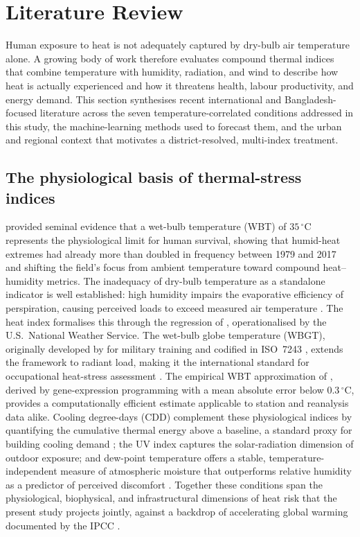 \documentclass[review,11pt]{elsarticle}
\newcommand{\degC}{\ensuremath{^{\circ}\mathrm{C}}}
\begin{document}
\section{Literature Review}\label{sec:litreview}

Human exposure to heat is not adequately captured by dry-bulb air temperature
alone. A growing body of work therefore evaluates compound thermal indices that
combine temperature with humidity, radiation, and wind to describe how heat is
actually experienced and how it threatens health, labour productivity, and energy
demand. This section synthesises recent international and Bangladesh-focused
literature across the seven temperature-correlated conditions addressed in this
study, the machine-learning methods used to forecast them, and the urban and
regional context that motivates a district-resolved, multi-index treatment.

\subsection{The physiological basis of thermal-stress indices}
\citet{raymond2020} provided seminal evidence that a wet-bulb temperature (WBT)
of $35\,\degC$ represents the physiological limit for human survival, showing that
humid-heat extremes had already more than doubled in frequency between 1979 and
2017 and shifting the field's focus from ambient temperature toward compound
heat--humidity metrics. The inadequacy of dry-bulb temperature as a standalone
indicator is well established: high humidity impairs the evaporative efficiency of
perspiration, causing perceived loads to exceed measured air temperature
\citep{steadman1979}. The heat index formalises this through the regression of
\citet{rothfusz1990}, operationalised by the U.S.\ National Weather Service. The
wet-bulb globe temperature (WBGT), originally developed by \citet{yaglou1957} for
military training and codified in ISO~7243 \citep{iso7243_2017}, extends the
framework to radiant load, making it the international standard for occupational
heat-stress assessment \citep{parsons2006}. The empirical WBT approximation of
\citet{stull2011}, derived by gene-expression programming with a mean absolute
error below $0.3\,\degC$, provides a computationally efficient estimate applicable
to station and reanalysis data alike. Cooling degree-days (CDD) complement these
physiological indices by quantifying the cumulative thermal energy above a
baseline, a standard proxy for building cooling demand \citep{spinoni2018,
bhatnagar2018}; the UV index \citep{who2002} captures the solar-radiation
dimension of outdoor exposure; and dew-point temperature offers a stable,
temperature-independent measure of atmospheric moisture that outperforms relative
humidity as a predictor of perceived discomfort \citep{lawrence2005}. Together
these conditions span the physiological, biophysical, and infrastructural
dimensions of heat risk that the present study projects jointly, against a
backdrop of accelerating global warming documented by the IPCC \citep{ipcc2022ar6}.
\end{document}
